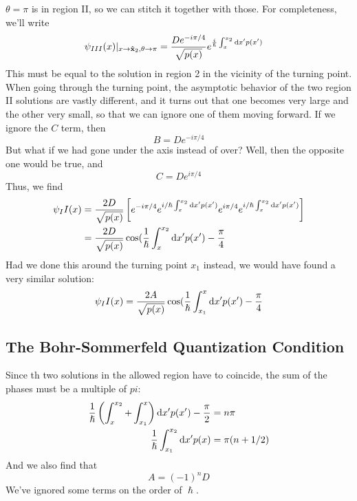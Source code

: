 \documentclass[a4paper]{article}
\begin{document}
$\theta=\pi$ is in region II, so we can stitch it together with those. For
completeness, we'll write
\begin{align*}
	\psi_{III}(x)|_{x\to\boldsymbol{\mathbf{\hat{x}}}_2, \theta\to\pi} &= \frac{De^{-i\pi/4}}
	{\sqrt{p(x)}}
	e^{\frac{i}{\hslash}\int_x^{x_2}\mathrm{d} x' p(x')}
\end{align*}
This must be equal to the solution in region 2 in the vicinity of the turning
point. When going through the turning point, the asymptotic behavior of the two
region II solutions are vastly different, and it turns out that one becomes
very large and the other very small, so that we can ignore one of them moving
forward. If we ignore the $C$ term, then
\[
	B = De^{-i\pi/4}
\]
But what if we had gone under the axis instead of over? Well, then the opposite
one would be true, and
\[
	C = De^{i\pi/4}
\]
Thus, we find
\begin{align*}
	\psi_II(x) &= \frac{2D}{\sqrt{p(x)}} \left[
	e^{-i\pi/4}e^{i/\hslash\int_x^{x_2}\mathrm{d} x' p(x')}
	e^{i\pi/4}e^{i/\hslash\int_x^{x_2}\mathrm{d} x' p(x')}\right]\\
	&= \frac{2D}{\sqrt{p(x)}}\cos(\frac{1}{\hslash}\int_x^{x_2}\mathrm{d} x' p(x')
	- \frac{\pi}{4}
\end{align*}
Had we done this around the turning point $x_1$ instead, we would have found a
very similar solution:
\[
	\psi_II(x)
	= \frac{2A}{\sqrt{p(x)}}\cos(\frac{1}{\hslash}\int_{x_1}^x\mathrm{d} x' p(x')
	- \frac{\pi}{4}
\]

\subsection{The Bohr-Sommerfeld Quantization Condition}
Since th two solutions in the allowed region have to coincide, the sum of the
phases must be a multiple of $pi$:
\begin{align*}
	\frac{1}{\hslash}\left(
		\int_x^{x_2}+ \int_{x_1}^x
	\right) \mathrm{d} x' p(x') - \frac{\pi}{2} &= n\pi\\
	\frac{1}{\hslash}\int_{x_1}^{x_2} \mathrm{d} x' p(x) &=
	\pi(n+1/2)
\end{align*}
And we also find that
\[
	A = (-1)^n D
\]
We've ignored some terms on the order of $\hslash$.
\end{document}
